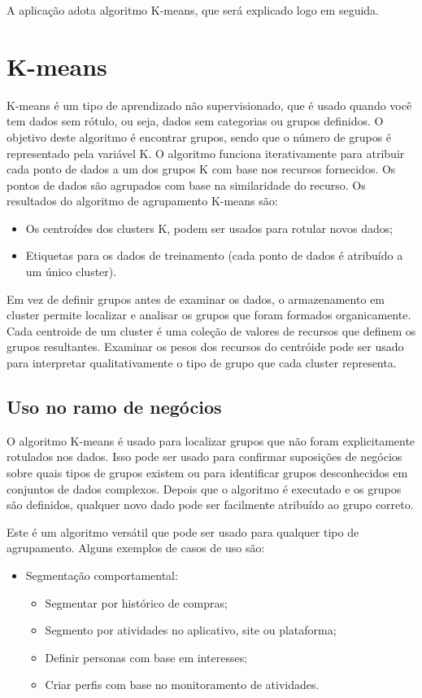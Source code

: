 \documentclass[12pt]{article}
\begin{document}
A aplicação adota algoritmo K-means, que será explicado logo em seguida.
\section{K-means}
K-means é um tipo de aprendizado não supervisionado, que é usado quando você tem dados sem rótulo, ou seja, dados sem categorias ou grupos definidos. O objetivo deste algoritmo é encontrar grupos, sendo que o número de grupos é representado pela variável K. O algoritmo funciona iterativamente para atribuir cada ponto de dados a um dos grupos K com base nos recursos fornecidos. Os pontos de dados são agrupados com base na similaridade do recurso. Os resultados do algoritmo de agrupamento K-means são:

\begin{itemize}
	\item Os centroídes dos clusters K, podem ser usados para rotular novos dados; 
	\item Etiquetas para os dados de treinamento (cada ponto de dados é atribuído a um único cluster).
\end{itemize}

Em vez de definir grupos antes de examinar os dados, o armazenamento em cluster permite localizar e analisar os grupos que foram formados organicamente. Cada centroide de um cluster é uma coleção de valores de recursos que definem os grupos resultantes. Examinar os pesos dos recursos do centróide pode ser usado para interpretar qualitativamente o tipo de grupo que cada cluster representa. 

\subsection{Uso no ramo de negócios}
O algoritmo K-means é usado para localizar grupos que não foram explicitamente rotulados nos dados. Isso pode ser usado para confirmar suposições de negócios sobre quais tipos de grupos existem ou para identificar grupos desconhecidos em conjuntos de dados complexos. Depois que o algoritmo é executado e os grupos são definidos, qualquer novo dado pode ser facilmente atribuído ao grupo correto.

Este é um algoritmo versátil que pode ser usado para qualquer tipo de agrupamento. Alguns exemplos de casos de uso são:

\begin{itemize}
	\item Segmentação comportamental:
	\begin{itemize}
		\item Segmentar por histórico de compras;
		\item Segmento por atividades no aplicativo, site ou plataforma;
		\item Definir personas com base em interesses;
		\item Criar perfis com base no monitoramento de atividades.
	\end{itemize}
\end{itemize}
\end{document}
